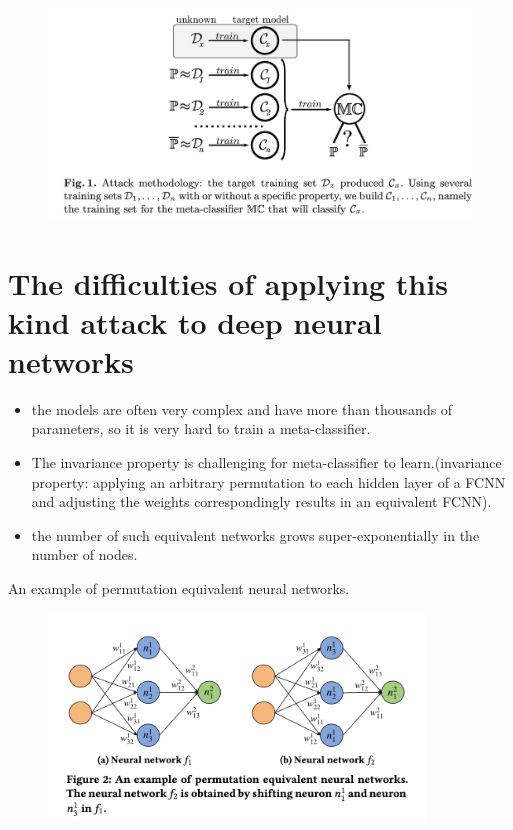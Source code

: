 \documentclass[11pt]{article}
\numberwithin{equation}{section}
\begin{document}
\begin{figure}[!h]
	\centering
	\includegraphics[width=12cm]{figures/property_inference_model.png}
	\label{fig:property inference model}
\end{figure}



\section{The difficulties of applying this kind attack to deep neural networks}

\begin{itemize}
    \item the models are often very complex and have more than thousands of parameters, so it is very hard to train a meta-classifier.
    \item The invariance property is challenging for meta-classifier to learn.(invariance property: applying an arbitrary permutation to each hidden layer of a FCNN and adjusting the weights correspondingly results in an equivalent FCNN).
    \item the number of such equivalent networks grows super-exponentially in the number of nodes.
\end{itemize}

An example of permutation equivalent neural networks.

\begin{figure}[!h]
	\centering
	\includegraphics[width=10cm]{figures/permutation_example.png}
	\label{fig:property inference model}
\end{figure}
\end{document}

